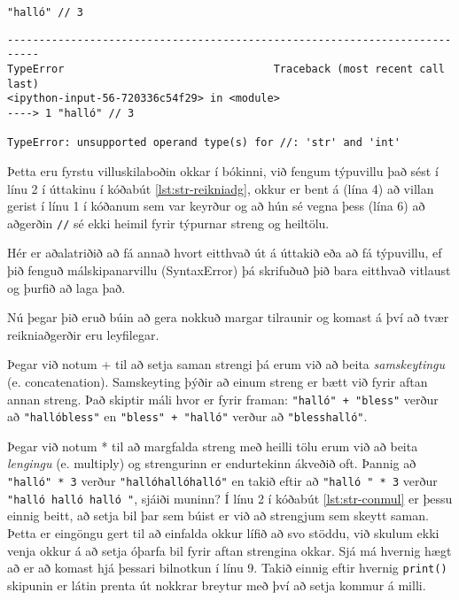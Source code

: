 \begin{lstlisting}[caption=Strengir og reikniaðgerðir, label=lst:str-reikniadg]
"halló" // 3
\end{lstlisting}
\lstset{style=uttak}
\begin{lstlisting}
---------------------------------------------------------------------------
TypeError                                 Traceback (most recent call last)
<ipython-input-56-720336c54f29> in <module>
----> 1 "halló" // 3

TypeError: unsupported operand type(s) for //: 'str' and 'int'
\end{lstlisting}
\lstset{style=venjulegt}

Þetta eru fyrstu villuskilaboðin okkar í bókinni, við fengum týpuvillu það sést í línu 2 í úttakinu í kóðabút \ref{lst:str-reikniadg}, okkur er bent á (lína 4) að villan gerist í línu 1 í kóðanum sem var keyrður og að hún sé vegna þess (lína 6) að aðgerðin \texttt{//} sé ekki heimil fyrir týpurnar streng og heiltölu.

Hér er aðalatriðið að fá annað hvort eitthvað út á úttakið eða að fá týpuvillu, ef þið fenguð málskipanarvillu (SyntaxError) þá skrifuðuð þið bara eitthvað vitlaust og þurfið að laga það.


Nú þegar þið eruð búin að gera nokkuð margar tilraunir og komast á því að tvær reikniaðgerðir eru leyfilegar.

Þegar við notum + til að setja saman strengi þá erum við að beita \textit{samskeytingu} (e. concatenation).
Samskeyting þýðir að einum streng er bætt við fyrir aftan annan streng.
Það skiptir máli hvor er fyrir framan: \texttt{"halló" + "bless"} verður að \texttt{"hallóbless"} en \texttt{"bless" + "halló"} verður að \texttt{"blesshalló"}.

Þegar við notum * til að margfalda streng með heilli tölu erum við að beita \emph{lengingu} (e. multiply) og strengurinn er endurtekinn ákveðið oft.
Þannig að \texttt{"halló" * 3} verður \texttt{"hallóhallóhalló"} en takið eftir að \texttt{"halló " * 3} verður \texttt{"halló halló halló "}, sjáiði muninn?
Í línu 2 í kóðabút \ref{lst:str-conmul} er þessu einnig beitt, að setja bil þar sem búist er við að strengjum sem skeytt saman.
Þetta er eingöngu gert til að einfalda okkur lífið að svo stöddu, við skulum ekki venja okkur á að setja óþarfa bil fyrir aftan strengina okkar.
Sjá má hvernig hægt að er að komast hjá þessari bilnotkun í línu 9.
Takið einnig eftir hvernig \texttt{print()} skipunin er látin prenta út nokkrar breytur með því að setja kommur á milli.

